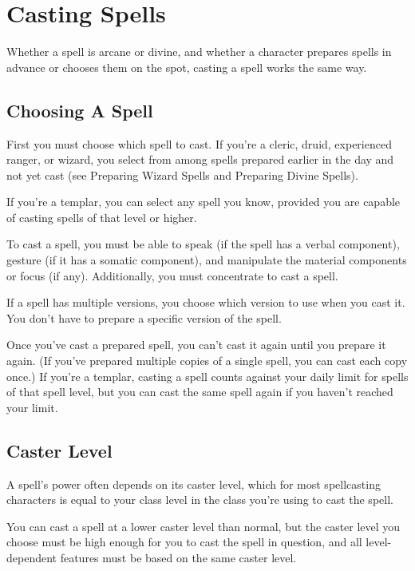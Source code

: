\section{Casting Spells}
Whether a spell is arcane or divine, and whether a character prepares spells in advance or chooses them on the spot, casting a spell works the same way.

\subsection{Choosing A Spell}
First you must choose which spell to cast. If you're a cleric, druid, experienced ranger, or wizard, you select from among spells prepared earlier in the day and not yet cast (see Preparing Wizard Spells and Preparing Divine Spells).

If you're a templar, you can select any spell you know, provided you are capable of casting spells of that level or higher.

To cast a spell, you must be able to speak (if the spell has a verbal component), gesture (if it has a somatic component), and manipulate the material components or focus (if any). Additionally, you must concentrate to cast a spell.

If a spell has multiple versions, you choose which version to use when you cast it. You don't have to prepare a specific version of the spell.

Once you've cast a prepared spell, you can't cast it again until you prepare it again. (If you've prepared multiple copies of a single spell, you can cast each copy once.) If you're a templar, casting a spell counts against your daily limit for spells of that spell level, but you can cast the same spell again if you haven't reached your limit.




\subsection{Caster Level}
A spell's power often depends on its caster level, which for most spellcasting characters is equal to your class level in the class you're using to cast the spell.

You can cast a spell at a lower caster level than normal, but the caster level you choose must be high enough for you to cast the spell in question, and all level-dependent features must be based on the same caster level.

